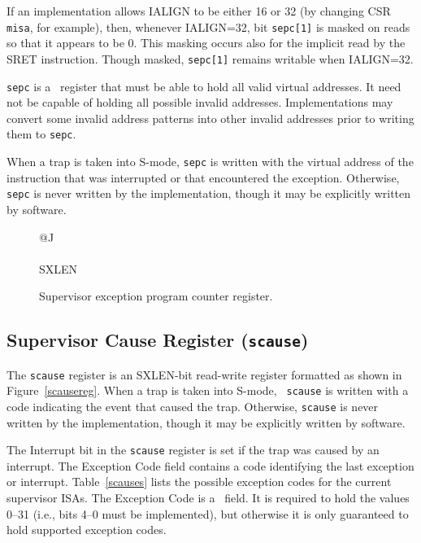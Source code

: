 If an implementation allows IALIGN to be either 16 or 32 (by
changing CSR {\tt misa}, for example), then, whenever IALIGN=32, bit
{\tt sepc[1]} is masked on reads so that it appears to be 0.  This
masking occurs also for the implicit read by the SRET instruction.
Though masked, {\tt sepc[1]} remains writable when IALIGN=32.

{\tt sepc} is a \warl\ register that must be able to hold all valid
virtual addresses.  It need not be capable of holding all possible invalid
addresses.  Implementations may convert some invalid address patterns into
other invalid addresses prior to writing them to {\tt sepc}.

When a trap is taken into S-mode, {\tt sepc} is written with the
virtual address of the instruction that was interrupted or that
encountered the exception.  Otherwise, {\tt sepc} is never written by
the implementation, though it may be explicitly written by software.

\begin{figure}[h!]
{\footnotesize
\begin{center}
\begin{tabular}{@{}J}
 \\
\hline
{} \\
\hline
SXLEN \\
\end{tabular}
\end{center}
}
\vspace{-0.1in}
\caption{Supervisor exception program counter register.}
\label{epcreg}
\end{figure}

\subsection{Supervisor Cause Register ({\tt scause})}
\label{sec:scause}

The {\tt scause} register is an SXLEN-bit read-write register formatted as
shown in Figure~\ref{scausereg}.  When a trap is taken into S-mode, {\tt
scause} is written with a code indicating the event that caused the trap.
Otherwise, {\tt scause} is never written by the implementation, though it may be
explicitly written by software.

The Interrupt bit in the {\tt scause} register is set if the
trap was caused by an interrupt. The Exception Code field
contains a code identifying the last exception or interrupt.  Table~\ref{scauses}
lists the possible exception codes for the current supervisor ISAs.
The Exception Code is a \wlrl\ field.  It is required to hold
the values 0--31 (i.e., bits 4--0 must be implemented), but otherwise
it is only guaranteed to hold supported exception codes.

